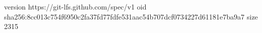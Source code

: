 version https://git-lfs.github.com/spec/v1
oid sha256:8cc013c754f6950c2fa37fd77fdfe531aac54b707dcf0734227d61181e7ba9a7
size 2315
